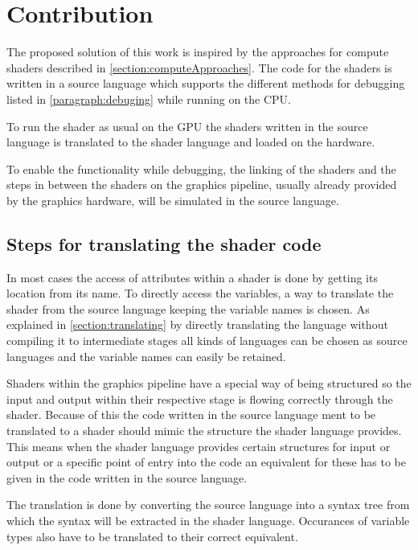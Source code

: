 

\chapter{Contribution}\label{cha:Contribution}

The proposed solution of this work is inspired by the approaches for compute shaders described in \autoref{section:computeApproaches}. The code for the shaders is written in a source language which supports the different methods for debugging listed in \autoref{paragraph:debuging} while running on the CPU.

To run the shader as usual on the GPU the shaders written in the source language is translated to the shader language and loaded on the hardware.

To enable the functionality while debugging, the linking of the shaders and the steps in between the shaders on the graphics pipeline, usually already provided by the graphics hardware, will be simulated in the source language.

\section{Steps for translating the shader code}
\label{section:contribution_translating}

In most cases the access of attributes within a shader is done by getting its location from its name. To directly access the variables, a way to translate the shader from the source language keeping the variable names is chosen. As explained in \autoref{section:translating} by directly translating the language without compiling it to intermediate stages all kinds of languages can be chosen as source languages and the variable names can easily be retained.

Shaders within the graphics pipeline have a special way of being structured so the input and output within their respective stage is flowing correctly through the shader. Because of this the code written in the source language ment to be translated to a shader should mimic the structure the shader language provides. This means when the shader language provides certain structures for input or output or a specific point of entry into the code an equivalent for these has to be given in the code written in the source language.

The translation is done by converting the source language into a syntax tree from which the syntax will be extracted in the shader language. Occurances of variable types also have to be translated to their correct equivalent.

